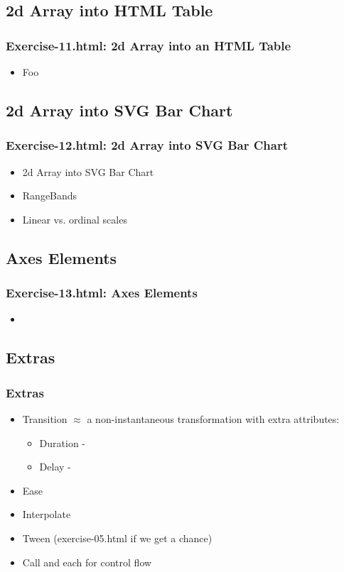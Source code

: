 \documentclass{beamer}
\begin{document}
\subsection{2d Array into HTML Table}

\begin{frame}
    \frametitle{Exercise-11.html: 2d Array into an HTML Table}
    \begin{itemize}
    \item Foo
    \end{itemize}
\end{frame}



\subsection{2d Array into SVG Bar Chart}

\begin{frame}
    \frametitle{Exercise-12.html: 2d Array into SVG Bar Chart}
    \begin{itemize}
    \item 2d Array into SVG Bar Chart
    \item RangeBands
    \item Linear vs. ordinal scales
    \end{itemize}
\end{frame}



\subsection{Axes Elements}

\begin{frame}
    \frametitle{Exercise-13.html: Axes Elements}
    \begin{itemize}
    \item 
    \end{itemize} 
\end{frame}



\subsection{Extras}

\begin{frame}
    \frametitle{Extras}
    \begin{itemize}
    \item Transition $\approx$ a non-instantaneous transformation with extra attributes:
        \begin{itemize}
        \item Duration - 
        \item Delay -  
        \end{itemize}
    \item Ease
    \item Interpolate
    \item Tween (exercise-05.html if we get a chance)
    \item Call and each for control flow 
    \end{itemize}
\end{frame}
\end{document}
